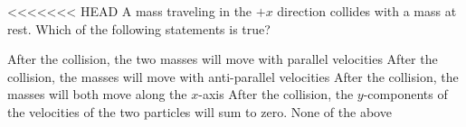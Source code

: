 \documentclass{../../oss-apphys-exam}
\begin{document}
\begin{multicols*}{2}
\begin{questions}
{{%
%
%

<<<<<<< HEAD
    \question A mass traveling in the $+x$ direction collides with a mass at
    rest. Which of the following statements is true?
    \begin{choices}
      \choice After the collision, the two masses will move with parallel
      velocities
      \choice After the collision, the masses will move with anti-parallel
      velocities
      \choice After the collision, the masses will both move along the $x$-axis
      \choice After the collision, the $y$-components of the velocities of the
      two particles will sum to zero.
      \choice None of the above
    \end{choices}
    
}}
\end{questions}
\end{multicols*}
\end{document}
